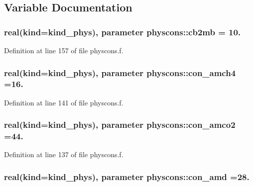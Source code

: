 \subsection{Variable Documentation}
\subsubsection[{\texorpdfstring{cb2mb}{cb2mb}}]{\setlength{\rightskip}{0pt plus 5cm}real(kind=kind\+\_\+phys), parameter physcons\+::cb2mb = 10.}\hypertarget{namespacephyscons_afee4867dffc4da15248cff2e4ef39992}{}\label{namespacephyscons_afee4867dffc4da15248cff2e4ef39992}


Definition at line 157 of file physcons.\+f.

\subsubsection[{\texorpdfstring{con\+\_\+amch4}{con_amch4}}]{\setlength{\rightskip}{0pt plus 5cm}real(kind=kind\+\_\+phys), parameter physcons\+::con\+\_\+amch4 =16.}\hypertarget{namespacephyscons_af16eb677db27151bc06db14eefd6c07d}{}\label{namespacephyscons_af16eb677db27151bc06db14eefd6c07d}


Definition at line 141 of file physcons.\+f.

\subsubsection[{\texorpdfstring{con\+\_\+amco2}{con_amco2}}]{\setlength{\rightskip}{0pt plus 5cm}real(kind=kind\+\_\+phys), parameter physcons\+::con\+\_\+amco2 =44.}\hypertarget{namespacephyscons_a1e3ed46b6ce3d1a82db6a192c840091f}{}\label{namespacephyscons_a1e3ed46b6ce3d1a82db6a192c840091f}


Definition at line 137 of file physcons.\+f.

\subsubsection[{\texorpdfstring{con\+\_\+amd}{con_amd}}]{\setlength{\rightskip}{0pt plus 5cm}real(kind=kind\+\_\+phys), parameter physcons\+::con\+\_\+amd =28.}\hypertarget{namespacephyscons_acb2960ad74b80b31da0bff4be5c2add3}{}\label{namespacephyscons_acb2960ad74b80b31da0bff4be5c2add3}


